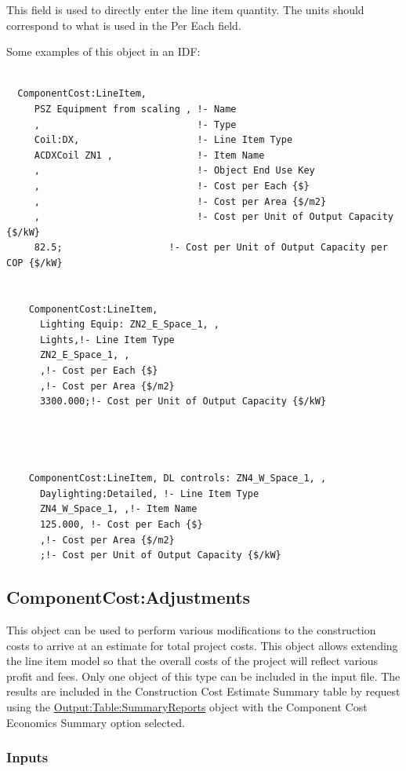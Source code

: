 This field is used to directly enter the line item quantity. The units should correspond to what is used in the Per Each field.

Some examples of this object in an IDF:

\begin{lstlisting}

  ComponentCost:LineItem,
     PSZ Equipment from scaling , !- Name
     ,                            !- Type
     Coil:DX,                     !- Line Item Type
     ACDXCoil ZN1 ,               !- Item Name
     ,                            !- Object End Use Key
     ,                            !- Cost per Each {$}
     ,                            !- Cost per Area {$/m2}
     ,                            !- Cost per Unit of Output Capacity {$/kW}
     82.5;                   !- Cost per Unit of Output Capacity per COP {$/kW}


    ComponentCost:LineItem,
      Lighting Equip: ZN2_E_Space_1, ,
      Lights,!- Line Item Type
      ZN2_E_Space_1, ,
      ,!- Cost per Each {$}
      ,!- Cost per Area {$/m2}
      3300.000;!- Cost per Unit of Output Capacity {$/kW}




    ComponentCost:LineItem, DL controls: ZN4_W_Space_1, ,
      Daylighting:Detailed, !- Line Item Type
      ZN4_W_Space_1, ,!- Item Name
      125.000, !- Cost per Each {$}
      ,!- Cost per Area {$/m2}
      ;!- Cost per Unit of Output Capacity {$/kW}
\end{lstlisting}

\subsection{ComponentCost:Adjustments}\label{componentcostadjustments}

This object can be used to perform various modifications to the construction costs to arrive at an estimate for total project costs. This object allows extending the line item model so that the overall costs of the project will reflect various profit and fees. Only one object of this type can be included in the input file. The results are included in the Construction Cost Estimate Summary table by request using the \hyperref[outputtablesummaryreports]{Output:Table:SummaryReports} object with the Component Cost Economics Summary option selected.

\subsubsection{Inputs}\label{inputs-1}

